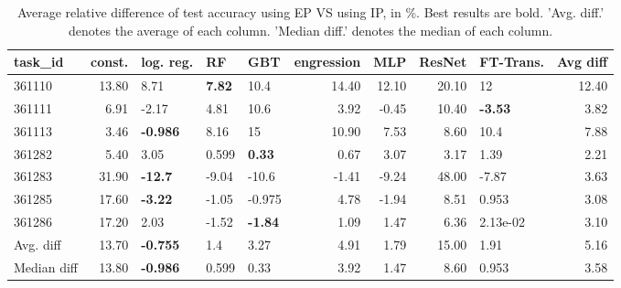 \begin{table}[ht!]
\centering
\begingroup\footnotesize
\begin{tabular}{lrlllrrrlr}
  \hline
\hline
task\_id & const. & log. reg. & RF & GBT & engression & MLP & ResNet & FT-Trans. & Avg diff \\ 
  \hline
361110 & 13.80 & 8.71 & \textbf{7.82} & 10.4 & 14.40 & 12.10 & 20.10 & 12 & 12.40 \\ 
  361111 & 6.91 & -2.17 & 4.81 & 10.6 & 3.92 & -0.45 & 10.40 & \textbf{-3.53} & 3.82 \\ 
  361113 & 3.46 & \textbf{-0.986} & 8.16 & 15 & 10.90 & 7.53 & 8.60 & 10.4 & 7.88 \\ 
  361282 & 5.40 & 3.05 & 0.599 & \textbf{0.33} & 0.67 & 3.07 & 3.17 & 1.39 & 2.21 \\ 
  361283 & 31.90 & \textbf{-12.7} & -9.04 & -10.6 & -1.41 & -9.24 & 48.00 & -7.87 & 3.63 \\ 
  361285 & 17.60 & \textbf{-3.22} & -1.05 & -0.975 & 4.78 & -1.94 & 8.51 & 0.953 & 3.08 \\ 
  361286 & 17.20 & 2.03 & -1.52 & \textbf{-1.84} & 1.09 & 1.47 & 6.36 & 2.13e-02 & 3.10 \\ 
   \hline
Avg. diff & 13.70 & \textbf{-0.755} & 1.4 & 3.27 & 4.91 & 1.79 & 15.00 & 1.91 & 5.16 \\ 
  Median diff & 13.80 & \textbf{-0.986} & 0.599 & 0.33 & 3.92 & 1.47 & 8.60 & 0.953 & 3.58 \\ 
   \hline
\hline
\end{tabular}
\endgroup
\caption{Average relative difference of test accuracy using EP VS using IP, in \%. 
                  Best results are bold. 
                  'Avg. diff.' denotes the average of each column.
                  'Median diff.' denotes the median of each column.} 
\label{TABLES/table_results_accuracy_clustering_num_and_cat_features_EP_VS_IP}
\end{table}
